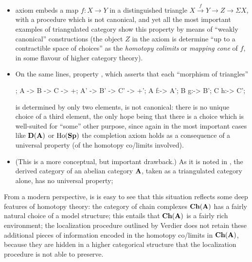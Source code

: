\begin{itemize}
\item axiom  embeds a map $f\colon X\to Y$ in a distinguished triangle $X\overset{f}\to Y\to Z\to \Sigma X$, with a procedure which is not canonical, and yet all the most important examples of triangulated category show this property by means of ``weakly canonical'' constructions (the object $Z$ in the axiom is determine ``up to a contractible space of choices'' as the \emph{homotopy colimits} or \emph{mapping cone} of $f$, in some flavour of higher category theory).
\item On the same lines, property , which asserts that each ``morphism of triangles''
\begin{center}
\begin{kD}
;
\mor A -> B -> C -> +;
\mor A' -> B' -> C' -> +';
\mor A f:-> A'; \mor B g:-> B'; \mor C h:-> C';
\end{kD}
\end{center}
is determined by only two elements, is not canonical: there is no unique choice of a third element, the only hope being that there is a choice which is well\hyp{}suited for ``some'' other purpose, since again in the most important cases like $\textbf{D}(\textbf{A})$ or $\text{Ho}(\textbf{Sp})$ the completion axiom holds as a consequence of a universal property (of the homotopy co\fshyp{}limits involved).
\item (This is a more conceptual, but important drawback.) As it is noted in \cite{maltsiniotis2007k}, the derived category of an abelian category $\textbf{A}$, taken as a triangulated category alone, has no universal property;
\end{itemize}
From a modern perspective, is is easy to see that this situation reflects some deep features of homotopy theory: the category of chain complexes $\textbf{Ch}(\textbf{A})$ has a fairly natural choice of a model structure; this entails that $\textbf{Ch}(\textbf{A})$ is a fairly rich environment; the localization procedure outlined by Verdier does not retain these additional pieces of information encoded in the homotopy co/limits in $\textbf{Ch}(\textbf{A})$, because they are hidden in a higher categorical structure that the localization procedure is not able to preserve.

